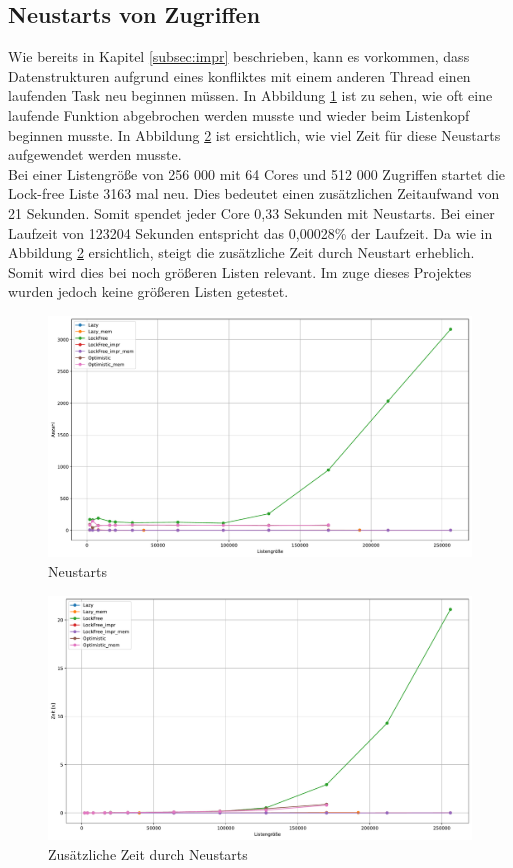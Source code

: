 \subsection{Neustarts von Zugriffen}
Wie bereits in Kapitel \ref{subsec:impr} beschrieben, kann es vorkommen, dass Datenstrukturen aufgrund eines konfliktes mit einem anderen
Thread einen laufenden Task neu beginnen müssen. 
In Abbildung \ref{fig:mixed_goToStart} ist zu sehen, wie oft eine laufende Funktion abgebrochen werden musste und wieder beim Listenkopf beginnen musste. 
In Abbildung \ref{fig:mixed_lostTime} ist ersichtlich, wie viel Zeit für diese Neustarts aufgewendet werden musste. \\
Bei einer Listengröße von 256 000 mit 64 Cores und 512 000 Zugriffen startet die Lock-free Liste 3163 mal neu. Dies bedeutet
einen zusätzlichen Zeitaufwand von 21 Sekunden. Somit spendet jeder Core 0,33 Sekunden mit Neustarts. Bei einer Laufzeit von 123204 Sekunden 
entspricht das 0,00028\% der Laufzeit. Da wie in Abbildung \ref{fig:mixed_lostTime} ersichtlich, steigt die zusätzliche Zeit durch Neustart erheblich.
Somit wird dies bei noch größeren Listen relevant. Im zuge dieses Projektes wurden jedoch keine größeren Listen getestet. 

\begin{figure}[ht!]
	\centering
	\includegraphics[width=1.0\linewidth]{./plots_pdf/mixed_goToStart.pdf} 
	\caption{Neustarts}
	\label{fig:mixed_goToStart} 
\end{figure}

\begin{figure}[ht!]
	\centering
	\includegraphics[width=1.0\linewidth]{./plots_pdf/mixed_lostTime.pdf} 
	\caption{Zusätzliche Zeit durch Neustarts}
	\label{fig:mixed_lostTime} 
\end{figure}


